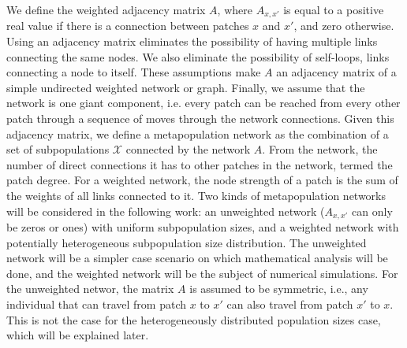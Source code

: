 We define the weighted adjacency matrix $A$, where $A_{x,x'}$ is equal to a positive real value if there is a connection between patches $x$ and $x'$, and zero otherwise. Using an adjacency matrix eliminates the possibility of having multiple links connecting the same nodes. We also eliminate the possibility of self-loops, links connecting a node to itself.  These assumptions make $A$ an adjacency matrix of a simple undirected weighted network or graph. Finally, we assume that the network is one giant component, i.e. every patch can be reached from every other patch through a sequence of moves through the network connections. Given this adjacency matrix, we define a metapopulation network as the combination of a set of subpopulations $\mathcal{X}$ connected by the network $A$. From the network, the number of direct connections it has to other patches in the network, termed the patch degree. For a weighted network, the node strength of a patch is the sum of the weights of all links connected to it. Two kinds of metapopulation networks will be considered in the following work: an unweighted network ($A_{x,x'}$ can only be zeros or ones) with uniform subpopulation sizes, and a weighted network with potentially heterogeneous subpopulation size distribution. The unweighted network will be a simpler case scenario on which mathematical analysis will be done, and the weighted network will be the subject of numerical simulations. For the unweighted networ, the matrix $A$ is assumed to be symmetric, i.e., any individual that can travel from patch $x$ to $x'$ can also travel from patch $x'$ to $x$. This is not the case for the heterogeneously distributed population sizes case, which will be explained later.\\

